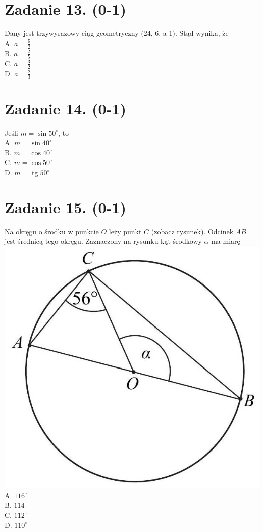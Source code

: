 \documentclass[10pt]{article}
\begin{document}
\section*{Zadanie 13. (0-1)}
Dany jest trzywyrazowy ciąg geometryczny (24, 6, a-1). Stąd wynika, że\\
A. \(a=\frac{5}{2}\)\\
B. \(a=\frac{2}{5}\)\\
C. \(a=\frac{3}{2}\)\\
D. \(a=\frac{2}{3}\)

\section*{Zadanie 14. (0-1)}
Jeśli \(m=\sin 50^{\circ}\), to\\
A. \(m=\sin 40^{\circ}\)\\
B. \(m=\cos 40^{\circ}\)\\
C. \(m=\cos 50^{\circ}\)\\
D. \(m=\operatorname{tg} 50^{\circ}\)

\section*{Zadanie 15. (0-1)}
Na okręgu o środku w punkcie \(O\) leży punkt \(C\) (zobacz rysunek). Odcinek \(A B\) jest średnicą tego okręgu. Zaznaczony na rysunku kąt środkowy \(\alpha\) ma miarę\\
\includegraphics[max width=\textwidth, center]{2024_11_21_7b5527312ea89ae66fd0g-08}\\
A. \(116^{\circ}\)\\
B. \(114^{\circ}\)\\
C. \(112^{\circ}\)\\
D. \(110^{\circ}\)
\end{document}
